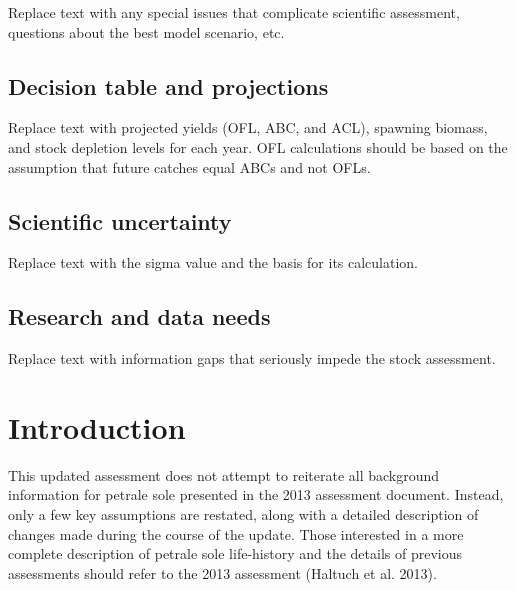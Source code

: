 \documentclass[11pt,
  english,
  letterpaper,
]{article}
\begin{document}
Replace text with any special issues that complicate scientific assessment, questions about the best model scenario, etc.

\hypertarget{decision-table-and-projections}{%
\subsection*{Decision table and projections}\label{decision-table-and-projections}}

Replace text with projected yields (OFL, ABC, and ACL), spawning biomass, and stock depletion levels for each year. OFL calculations should be based on the assumption that future catches equal ABCs and not OFLs.

\hypertarget{scientific-uncertainty}{%
\subsection*{Scientific uncertainty}\label{scientific-uncertainty}}

Replace text with the sigma value and the basis for its calculation.

\hypertarget{research-and-data-needs}{%
\subsection*{Research and data needs}\label{research-and-data-needs}}

Replace text with information gaps that seriously impede the stock assessment.

\pagebreak
\setlength{\parskip}{5mm plus1mm minus1mm}
\setcounter{page}{1}
\renewcommand{\thefigure}{\arabic{figure}}
\renewcommand{\thetable}{\arabic{table}}
\setcounter{table}{0}
\setcounter{figure}{0}

\hypertarget{introduction}{%
\section{Introduction}\label{introduction}}

This updated assessment does not attempt to reiterate all background information for petrale sole presented in the 2013 assessment document. Instead, only a few key assumptions are restated, along with a detailed description of changes made during the course of the update. Those interested in a more complete description of petrale sole life-history and the details of previous assessments should refer to the 2013 assessment (Haltuch et al. 2013).
\end{document}
